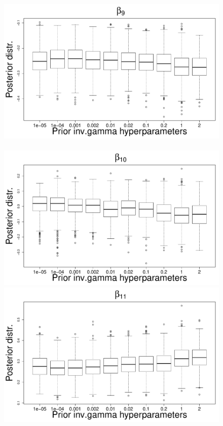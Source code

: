 \documentclass{statsoc}
\numberwithin{figure}{section}
\numberwithin{table}{section}
\begin{document}
\begin{figure}
\centering

\includegraphics[scale=0.25]{Sensitivity/beta_9_sensitivity.pdf}~
\includegraphics[scale=0.25]{Sensitivity/beta_10_sensitivity.pdf}\\
\includegraphics[scale=0.25]{Sensitivity/beta_11_sensitivity.pdf}~

\end{figure}
\end{document}
